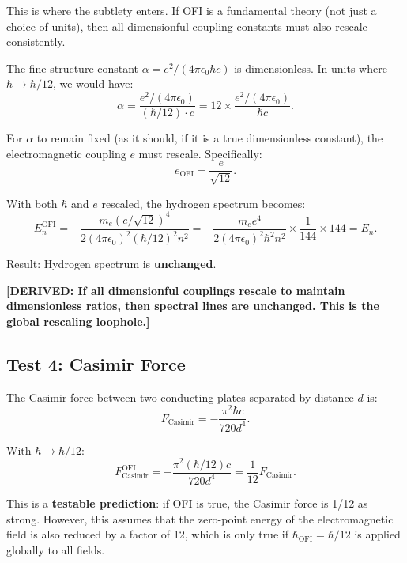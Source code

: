 \documentclass[12pt]{article}
\theoremstyle{definition}
\newcommand{\DERIVED}[1]{\textcolor{derivedcolor}{\textbf{[DERIVED: #1]}}}
\begin{document}
This is where the subtlety enters. If OFI is a fundamental theory (not just a choice
of units), then all dimensionful coupling constants must also rescale consistently.

The fine structure constant $\alpha = e^2/(4\pi\epsilon_0\hbar c)$ is dimensionless.
In units where $\hbar \to \hbar/12$, we would have:
\begin{equation}
  \alpha = \frac{e^2/(4\pi\epsilon_0)}{(\hbar/12) \cdot c} = 12 \times \frac{e^2/(4\pi\epsilon_0)}{\hbar c}.
\end{equation}

For $\alpha$ to remain fixed (as it should, if it is a true dimensionless constant),
the electromagnetic coupling $e$ must rescale. Specifically:
\begin{equation}
  e_{\mathrm{OFI}} = \frac{e}{\sqrt{12}}.
\end{equation}

With both $\hbar$ and $e$ rescaled, the hydrogen spectrum becomes:
\begin{equation}
  E_n^{\mathrm{OFI}} = -\frac{m_e (e/\sqrt{12})^4}{2(4\pi\epsilon_0)^2 (\hbar/12)^2 n^2}
  = -\frac{m_e e^4}{2(4\pi\epsilon_0)^2 \hbar^2 n^2} \times \frac{1}{144} \times 144
  = E_n.
\end{equation}

Result: Hydrogen spectrum is \textbf{unchanged}.

\DERIVED{If all dimensionful couplings rescale to maintain dimensionless ratios, then
spectral lines are unchanged. This is the global rescaling loophole.}

\subsection{Test 4: Casimir Force}

The Casimir force between two conducting plates separated by distance $d$ is:
\begin{equation}
  F_{\mathrm{Casimir}} = -\frac{\pi^2 \hbar c}{720 d^4}.
\end{equation}

With $\hbar \to \hbar/12$:
\begin{equation}
  F_{\mathrm{Casimir}}^{\mathrm{OFI}} = -\frac{\pi^2 (\hbar/12) c}{720 d^4}
  = \frac{1}{12} F_{\mathrm{Casimir}}.
\end{equation}

This is a \textbf{testable prediction}: if OFI is true, the Casimir force is 1/12 as strong.
However, this assumes that the zero-point energy of the electromagnetic field is also
reduced by a factor of 12, which is only true if $\hbar_{\mathrm{OFI}} = \hbar/12$ is
applied globally to all fields.
\end{document}
